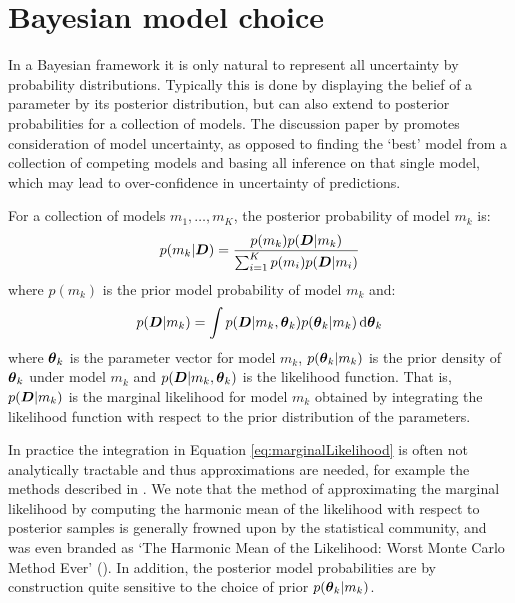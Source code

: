 \section{Bayesian model choice}
\label{sec:Bayesian_model_choice}

In a Bayesian framework it is only natural to represent all uncertainty by probability distributions. Typically this is
done by displaying the belief of a parameter by its posterior distribution, but can also extend to posterior
probabilities for a collection of models. The discussion paper by \cite{draper1995} promotes consideration of model
uncertainty, as opposed to finding the `best' model from a collection of competing models and basing all inference on
that single model, which may lead to over-confidence in uncertainty of predictions.

For a collection of models \(m_1, \ldots, m_K\), the posterior probability of model \(m_k\) is:
\begin{align} 
\label{eq:posteriorModelProb}
p(m_k | \boldsymbol{D}) = \frac{p(m_k) p(\boldsymbol{D} | m_k)}{\sum_{i=1}^K p(m_i) p(\boldsymbol{D} | m_i)}
\end{align}
where \(p(m_k)\) is the prior model probability of model \(m_k\) and:
\begin{align}
\label{eq:marginalLikelihood}
p(\boldsymbol{D} | m_k) = \int p(\boldsymbol{D} | m_k, \boldsymbol{\theta}_k) p(\boldsymbol{\theta}_k | m_k) \, \mathrm{d}\boldsymbol{\theta}_k
\end{align}
where \(\boldsymbol{\theta}_k\) is the parameter vector for model \(m_k\), \(p(\boldsymbol{\theta}_k | m_k)\) is the prior density of
\(\boldsymbol{\theta}_k\) under model \(m_k\) and \(p(\boldsymbol{D} | m_k, \boldsymbol{\theta}_k)\) is the likelihood function. That is, \(p(\boldsymbol{D}
| m_k)\) is the marginal likelihood for model \(m_k\) obtained by integrating the likelihood function with respect to
the prior distribution of the parameters. 

In practice the integration in Equation \eqref{eq:marginalLikelihood} is often not analytically tractable and thus
approximations are needed, for example the methods described in \cite{chib2001}. We note that the method of
approximating the marginal likelihood by computing the harmonic mean of the likelihood with respect to posterior samples
is generally frowned upon by the statistical community, and was even branded as `The Harmonic Mean of the Likelihood:
Worst Monte Carlo Method Ever' (\cite{radford2008}). In addition, the posterior model probabilities are by construction
quite sensitive to the choice of prior \(p(\boldsymbol{\theta}_k | m_k)\).

